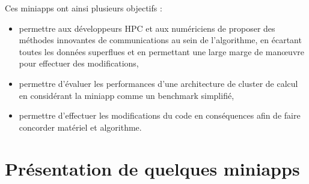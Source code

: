 \documentclass[11pt,a4paper,oneside]{memoir}
\theoremstyle{definition}
\theoremstyle{remark}
\theoremstyle{plain}
\begin{document}
Ces miniapps ont ainsi plusieurs objectifs :
\begin{itemize}
\item permettre aux développeurs HPC et aux numériciens de proposer des méthodes innovantes de communications au sein de l'algorithme, en écartant toutes les données superflues et en permettant une large marge de manœuvre pour effectuer des modifications,
\item permettre d'évaluer les performances d'une architecture de cluster de calcul en considérant la miniapp comme un benchmark simplifié,
\item permettre d'effectuer les modifications du code en conséquences afin de faire concorder matériel et algorithme.
\end{itemize}\bigskip



\section{Présentation de quelques miniapps}
\end{document}
